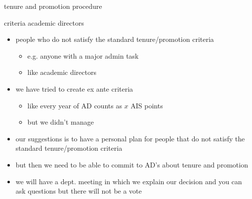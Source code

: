 \documentclass[presentation]{beamer}
\begin{document}
\begin{frame}[label={sec:orgbabc164}]{tenure and promotion procedure}
\begin{block}{criteria academic directors}
\begin{itemize}
\item people who do not satisfy the standard tenure/promotion criteria
\begin{itemize}
\item e.g. anyone with a major admin task
\item like academic directors
\end{itemize}
\item we have tried to create ex ante criteria
\begin{itemize}
\item like every year of AD counts as \(x\) AIS points
\item but we didn't manage
\end{itemize}
\item our suggestions is to have a personal plan for people that do not satisfy the standard tenure/promotion criteria
\item but then we need to be able to commit to AD's about tenure and promotion
\item we will have a dept. meeting in which we explain our decision and you can ask questions but there will not be a vote
\end{itemize}
\end{block}
\end{frame}
\end{document}

